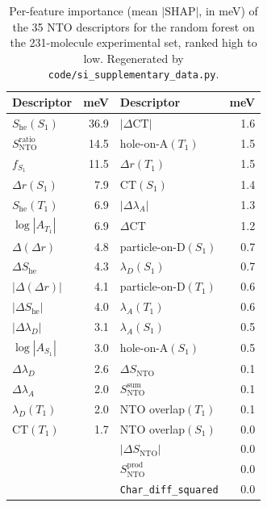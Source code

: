 \documentclass[twoside,twocolumn,9pt]{extarticle}
\begin{document}
\begin{table}[htbp]
  \centering
  \caption{Per-feature importance (mean $|\text{SHAP}|$, in meV) of the \num{35}
    NTO descriptors for the random forest on the \num{231}-molecule experimental
    set, ranked high to low. Regenerated by
    \texttt{code/si\_supplementary\_data.py}.}
  \label{tab:shap}
  \footnotesize
  \begin{tabular}{lr@{\hskip 2em}lr}
    \toprule
    Descriptor & meV & Descriptor & meV \\
    \midrule
    $S_\text{he}(S_1)$        & 36.9 & $|\Delta\text{CT}|$            & 1.6 \\
    $S_\text{NTO}^{\text{ratio}}$ & 14.5 & hole-on-A$(T_1)$          & 1.5 \\
    $f_{S_1}$                 & 11.5 & $\Delta r(T_1)$               & 1.5 \\
    $\Delta r(S_1)$           &  7.9 & $\text{CT}(S_1)$              & 1.4 \\
    $S_\text{he}(T_1)$        &  6.9 & $|\Delta\lambda_A|$          & 1.3 \\
    $\log|A_{T_1}|$           &  6.9 & $\Delta\text{CT}$            & 1.2 \\
    $\Delta(\Delta r)$        &  4.8 & particle-on-D$(S_1)$         & 0.7 \\
    $\Delta S_\text{he}$      &  4.3 & $\lambda_D(S_1)$             & 0.7 \\
    $|\Delta(\Delta r)|$      &  4.1 & particle-on-D$(T_1)$         & 0.6 \\
    $|\Delta S_\text{he}|$    &  4.0 & $\lambda_A(T_1)$             & 0.6 \\
    $|\Delta\lambda_D|$       &  3.1 & $\lambda_A(S_1)$             & 0.5 \\
    $\log|A_{S_1}|$           &  3.0 & hole-on-A$(S_1)$             & 0.5 \\
    $\Delta\lambda_D$         &  2.6 & $\Delta S_\text{NTO}$        & 0.1 \\
    $\Delta\lambda_A$         &  2.0 & $S_\text{NTO}^{\text{sum}}$  & 0.1 \\
    $\lambda_D(T_1)$          &  2.0 & NTO overlap$(T_1)$           & 0.1 \\
    $\text{CT}(T_1)$          &  1.7 & NTO overlap$(S_1)$           & 0.0 \\
    \multicolumn{2}{l}{} & $|\Delta S_\text{NTO}|$         & 0.0 \\
    \multicolumn{2}{l}{} & $S_\text{NTO}^{\text{prod}}$    & 0.0 \\
    \multicolumn{2}{l}{} & \texttt{Char\_diff\_squared}    & 0.0 \\
    \bottomrule
  \end{tabular}
\end{table}
\end{document}
